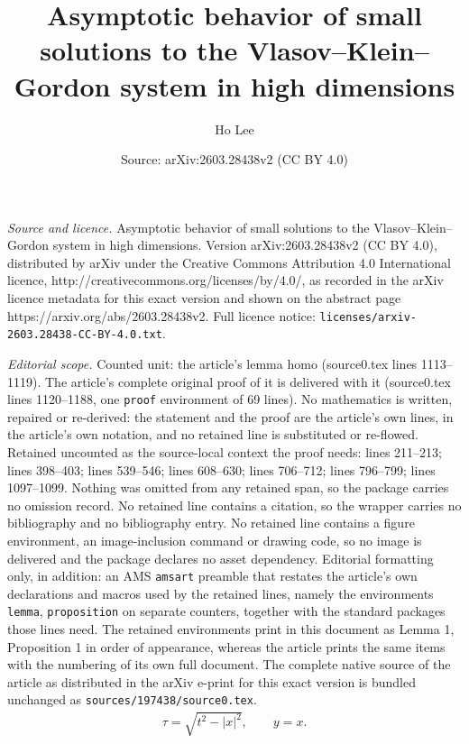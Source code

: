 \documentclass[10pt,a4paper]{amsart}
\title{Asymptotic behavior of small solutions to the Vlasov--Klein--Gordon system in high dimensions}
\author{Ho Lee}
\date{Source: arXiv:2603.28438v2 (CC BY 4.0)}
\begin{document}
\maketitle

\noindent\emph{Source and licence.} Asymptotic behavior of small solutions to the Vlasov--Klein--Gordon system in high dimensions. Version arXiv:2603.28438v2 (CC BY 4.0), distributed by arXiv under the Creative Commons Attribution 4.0 International licence, http://creativecommons.org/licenses/by/4.0/, as recorded in the arXiv licence metadata for this exact version and shown on the abstract page https://arxiv.org/abs/2603.28438v2. Full licence notice: \texttt{licenses/arxiv-2603.28438-CC-BY-4.0.txt}.\par\smallskip

\noindent\textit{Editorial scope.} Counted unit: the article's lemma homo (source0.tex lines 1113--1119). The article's complete original proof of it is delivered with it (source0.tex lines 1120--1188, one \texttt{proof} environment of 69 lines). No mathematics is written, repaired or re-derived: the statement and the proof are the article's own lines, in the article's own notation, and no retained line is substituted or re-flowed.  Retained uncounted as the source-local context the proof needs: lines 211--213; lines 398--403; lines 539--546; lines 608--630; lines 706--712; lines 796--799; lines 1097--1099.  Nothing was omitted from any retained span, so the package carries no omission record.  No retained line contains a citation, so the wrapper carries no bibliography and no bibliography entry.  No retained line contains a figure environment, an image-inclusion command or drawing code, so no image is delivered and the package declares no asset dependency.  Editorial formatting only, in addition: an AMS \texttt{amsart} preamble that restates the article's own declarations and macros used by the retained lines, namely the environments \texttt{lemma}, \texttt{proposition} on separate counters, together with the standard packages those lines need.  The retained environments print in this document as Lemma 1, Proposition 1 in order of appearance, whereas the article prints the same items with the numbering of its own full document.  The complete native source of the article as distributed in the arXiv e-print for this exact version is bundled unchanged as \texttt{sources/197438/source0.tex}.
\begin{align}
\tau = \sqrt{ t^2 - | x |^2 } , \qquad y = x . \label{tau}
\end{align}
\end{document}
